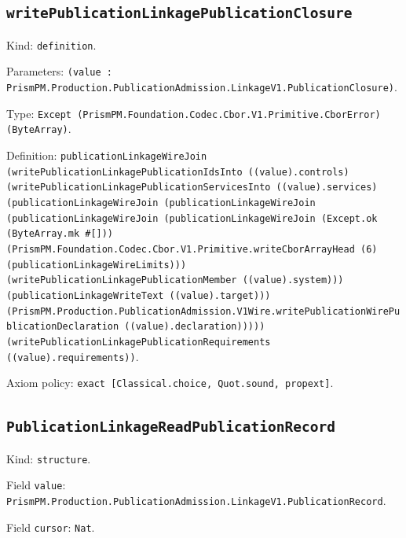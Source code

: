 \documentclass[11pt]{article}
\begin{document}
\subsection*{\texttt{writePublicationLinkagePublicationClosure}}
\noindent Kind: \texttt{definition}.\par
\noindent Parameters: \texttt{(value : PrismPM.Production.PublicationAdmission.LinkageV1.PublicationClosure)}.\par
\noindent Type: \texttt{Except (PrismPM.Foundation.Codec.Cbor.V1.Primitive.CborError) (ByteArray)}.\par
\noindent Definition: \texttt{publicationLinkageWireJoin (writePublicationLinkagePublicationIdsInto ((value).controls) (writePublicationLinkagePublicationServicesInto ((value).services) (publicationLinkageWireJoin (publicationLinkageWireJoin (publicationLinkageWireJoin (publicationLinkageWireJoin (Except.ok (ByteArray.mk \#[])) (PrismPM.Foundation.Codec.Cbor.V1.Primitive.writeCborArrayHead (6) (publicationLinkageWireLimits))) (writePublicationLinkagePublicationMember ((value).system))) (publicationLinkageWriteText ((value).target))) (PrismPM.Production.PublicationAdmission.V1Wire.writePublicationWirePublicationDeclaration ((value).declaration))))) (writePublicationLinkagePublicationRequirements ((value).requirements))}.\par
\noindent Axiom policy: \texttt{exact [Classical.choice, Quot.sound, propext]}.\par
\subsection*{\texttt{PublicationLinkageReadPublicationRecord}}
\noindent Kind: \texttt{structure}.\par
\noindent Field \texttt{value}: \texttt{PrismPM.Production.PublicationAdmission.LinkageV1.PublicationRecord}.\par
\noindent Field \texttt{cursor}: \texttt{Nat}.\par
\end{document}
